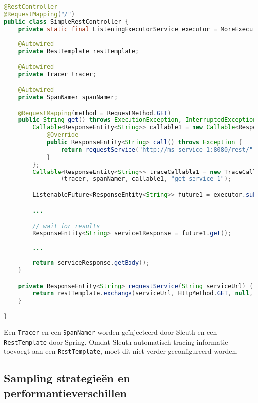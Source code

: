 \begin{lstlisting}[language=Java, basicstyle=\ttfamily\scriptsize, caption=Asynchrone REST communicatie]
@RestController
@RequestMapping("/")
public class SimpleRestController {
    private static final ListeningExecutorService executor = MoreExecutors.listeningDecorator(Executors.newCachedThreadPool());
    
    @Autowired
    private RestTemplate restTemplate;

    @Autowired
    private Tracer tracer;

    @Autowired
    private SpanNamer spanNamer;

    @RequestMapping(method = RequestMethod.GET)
    public String get() throws ExecutionException, InterruptedException {
        Callable<ResponseEntity<String>> callable1 = new Callable<ResponseEntity<String>>() {
            @Override
            public ResponseEntity<String> call() throws Exception {
                return requestService("http://ms-service-1:8080/rest/");
            }
        };
        Callable<ResponseEntity<String>> traceCallable1 = new TraceCallable<>
                (tracer, spanNamer, callable1, "get_service_1");

        ListenableFuture<ResponseEntity<String>> future1 = executor.submit(traceCallable1);

        ...

        // wait for results
        ResponseEntity<String> service1Response = future1.get();
        
        ...
        
        return serviceResponse.getBody();
    }

    private ResponseEntity<String> requestService(String serviceUrl) {
        return restTemplate.exchange(serviceUrl, HttpMethod.GET, null, String.class);
    }

}
\end{lstlisting}

Een \texttt{Tracer} en een \texttt{SpanNamer} worden geïnjecteerd door Sleuth en een \texttt{RestTemplate} door Spring. Omdat Sleuth automatisch tracing informatie toevoegt aan een \texttt{RestTemplate}, moet dit niet verder geconfigureerd worden.

\subsection{Sampling strategieën en performantieverschillen}
\label{sec:sampling}

